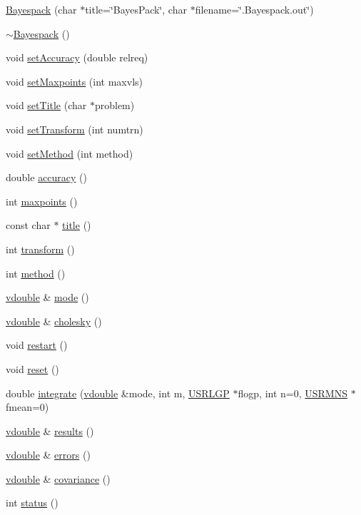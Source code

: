 \begin{CompactItemize}
\item 
\hyperlink{classBayespack_a0}{Bayespack} (char $\ast$title=\char`\"{}Bayes\-Pack\char`\"{}, char $\ast$filename=\char`\"{}.Bayespack.out\char`\"{})
\item 
\hyperlink{classBayespack_a1}{$\sim$Bayespack} ()
\item 
void \hyperlink{classBayespack_a2}{set\-Accuracy} (double relreq)
\item 
void \hyperlink{classBayespack_a3}{set\-Maxpoints} (int maxvls)
\item 
void \hyperlink{classBayespack_a4}{set\-Title} (char $\ast$problem)
\item 
void \hyperlink{classBayespack_a5}{set\-Transform} (int numtrn)
\item 
void \hyperlink{classBayespack_a6}{set\-Method} (int method)
\item 
double \hyperlink{classBayespack_a7}{accuracy} ()
\item 
int \hyperlink{classBayespack_a8}{maxpoints} ()
\item 
const char $\ast$ \hyperlink{classBayespack_a9}{title} ()
\item 
int \hyperlink{classBayespack_a10}{transform} ()
\item 
int \hyperlink{classBayespack_a11}{method} ()
\item 
\hyperlink{PoissonGammaFit_8hpp_a0}{vdouble} \& \hyperlink{classBayespack_a12}{mode} ()
\item 
\hyperlink{PoissonGammaFit_8hpp_a0}{vdouble} \& \hyperlink{classBayespack_a13}{cholesky} ()
\item 
void \hyperlink{classBayespack_a14}{restart} ()
\item 
void \hyperlink{classBayespack_a15}{reset} ()
\item 
double \hyperlink{classBayespack_a16}{integrate} (\hyperlink{PoissonGammaFit_8hpp_a0}{vdouble} \&mode, int m, \hyperlink{Bayespack_8hpp_a3}{USRLGP} $\ast$flogp, int n=0, \hyperlink{Bayespack_8hpp_a4}{USRMNS} $\ast$fmean=0)
\item 
\hyperlink{PoissonGammaFit_8hpp_a0}{vdouble} \& \hyperlink{classBayespack_a17}{results} ()
\item 
\hyperlink{PoissonGammaFit_8hpp_a0}{vdouble} \& \hyperlink{classBayespack_a18}{errors} ()
\item 
\hyperlink{PoissonGammaFit_8hpp_a0}{vdouble} \& \hyperlink{classBayespack_a19}{covariance} ()
\item 
int \hyperlink{classBayespack_a20}{status} ()
\end{CompactItemize}


